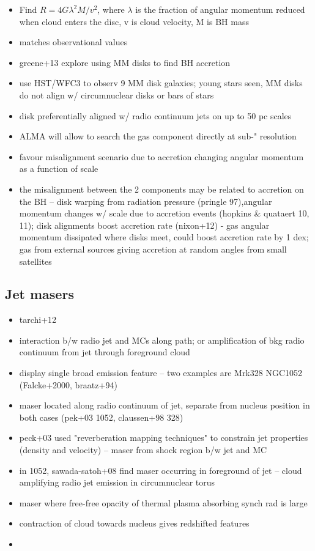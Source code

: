 \begin{itemize}
\item Find $R=4G\lambda^2M/v^2$, where $\lambda$ is the fraction of angular momentum reduced when cloud enters the disc, v is cloud velocity, M is BH mass
\item matches observational values
\item greene+13 explore using MM disks to find BH accretion
\item use HST/WFC3 to observ 9 MM disk galaxies; young stars seen, MM disks do not align w/ circumnuclear disks or bars of stars
\item disk preferentially aligned w/ radio continuum jets on up to 50 pc scales
\item ALMA will allow to search the gas component directly at sub-" resolution
\item favour misalignment scenario due to accretion changing angular momentum as a function of scale
\item the misalignment between the 2 components may be related to accretion on the BH -- disk warping from radiation pressure (pringle 97),angular momentum changes w/ scale due to accretion events (hopkins \& quataert 10, 11); disk alignments boost accretion rate (nixon+12) - gas angular momentum dissipated where disks meet, could boost accretion rate by 1 dex; gas from external sources giving accretion at random angles from small satellites
\end{itemize}

\subsection{Jet masers}
\label{sub:h2o_jets}

\begin{itemize}
\item tarchi+12
\item interaction b/w radio jet and MCs along path; or amplification of bkg radio continuum from jet through foreground cloud
\item display single broad emission feature -- two examples are Mrk328 NGC1052 (Falcke+2000, braatz+94)
\item maser located along radio continuum of jet, separate from nucleus position in both cases (pek+03 1052, claussen+98 328)
\item peck+03 used "reverberation mapping techniques" to constrain jet properties (density and velocity) -- maser from shock region b/w jet and MC
\item in 1052, sawada-satoh+08 find maser occurring in foreground of jet -- cloud amplifying radio jet emission in circumnuclear torus
\item maser where free-free opacity of thermal plasma absorbing synch rad is large
\item contraction of cloud towards nucleus gives redshifted features
\item 
\end{itemize}

